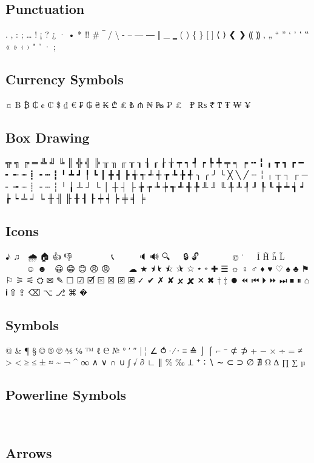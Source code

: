 \subsection{Punctuation}

. , : ; … ! ¡ ? ¿ · • * ‼ \# ‾ / \textbackslash{} - – — ― ‖ \_ ‗ ( ) \{ \} [ ] ⟨ ⟩ ❮ ❯ ⸨ ⸩ ‚ „ “ ” ‘ ’ ‛ ‟ « » ‹ › " ' · ;

\subsection{Currency Symbols}

¤ ฿ ₿ ₵ ¢ ₡ \$ ₫ € ₣ ₲ ₴ ₭ ₾ ₤ ₺ ₼ ₦ ₧ ₱ £ ⃁ ₽ ₨ ₹ ₸ ₮ ₩ ¥

\subsection{Box Drawing}

╦ ╗ ╔ ═ ╩ ╝ ╚ ║ ╬ ╣ ╠ ╥ ╖ ╓ ┰ ┒ ┧ ┎ ┟ ╁ ┯ ┑ ┩ ┍ ┡ ╇ ╤ ╕ ╒ ╍ ╏ ╻ ┳ ┓ ┏ ━ ╸ ╾ ┉ ┋ ╺ ┅ ┇ ╹ ┻ ┛ ╿ ┗ ┃ ╋ ┫ ┣ ╅ ┭ ┵ ┽ ┲ ┺ ╊ ╃ ╮ ╭ ╯ ╰ ╳ ╲ ╱ ╌ ╎ ╷ ┬ ┐ ┌ ─ ╴ ╼ ┈ ┊ ╶ ┄ ┆ ╵ ╽ ┴ ┘ └ │ ┼ ┤ ├ ╆ ┮ ┶ ┾ ┱ ┹ ╉ ╄ ╨ ╜ ╙ ╀ ┸ ┦ ┚ ┞ ┖ ╈ ┷ ┪ ┙ ┢ ┕ ╧ ╛ ╘ ╫ ╢ ╟ ╂ ┨ ┠ ┿ ┥ ┝ ╪ ╡ ╞

\subsection{Icons}

♪ ♫ 🌙 🌧 🏠 👍 👎 👤 💬 💾 📀 📁 📂 📆 📞 📱 📶 🔀 🔁 🔈 🔊 🔍 🔎 🔑 🔒 🔓 🖤 🗀 🗁 🗑 🗕 🗖                  ☺ ☻ ☹ 😀 😁 😊 😠 😡   🛒 ☁ ★ ⯨ ⯩ ⯪ ⯫ ☆ ⭑ ⭒ ✚ ☰ ☼ ♀ ♂ ♦ ♥ ♡ ♠ ♣ ⚑ ⚐ ⚞ ⚟ ⛭ ✉ ✎ ☐ ☑ 🗹 ⮽ ☒ 🗵 🗷 ✓ ✔ ✗ ✘ 🗴 🗶 ✕ ✖ † ‡ ⏺ ⏪ ⏮ ⏵ ⏩ ⏭ ⏹ ⏸ ⌂ ℹ ⇧ ⇪ ⌫ ⌥ ⎇ ⌘ �

\subsection{Symbols}

@ \& ¶ § © ® ℗ ⅍ ℅ ™ ℓ ℮ № ° ′ ″ | ¦ ∠ ⥀ ∙ ∕ ⋅ ≡ ≙ ⌡ ⌠ ⌐ ⁻ ⊄ ⊅ + − × ÷ = ≠ > < ≥ ≤ ± ≈ \~{} ¬ \textasciicircum{} ∞ ∧ ∨ ∩ ∪ ∫ √ ∂ ∟ ∥ \% ‰ ⟂ ⁺ ∶ ∖ ∼ ⊂ ⊃ ∅ ∄ Ω ∆ ∏ ∑ µ

\subsection{Powerline Symbols}

        ㏑

\subsection{Arrows}

